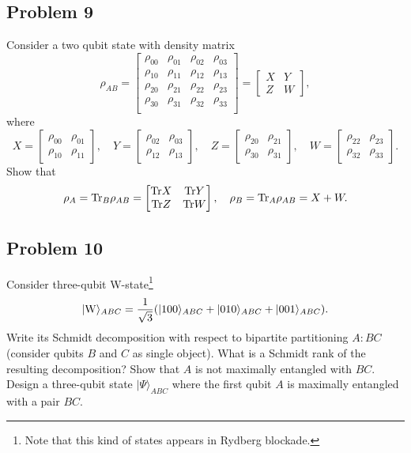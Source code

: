 \documentclass[a4paper,10pt]{article}
\newcommand{\ket}[1]{|#1\rangle}
\newcommand{\tr}{\ensuremath{{\rm Tr}}}
\begin{document}
\subsection*{Problem 9}
Consider a two qubit state with density matrix
\begin{equation}
	\rho_{AB} = \begin{bmatrix}
		\rho_{00} & \rho_{01} & \rho_{02} & \rho_{03} \\
		\rho_{10} & \rho_{11} & \rho_{12} & \rho_{13} \\
		\rho_{20} & \rho_{21} & \rho_{22} & \rho_{23} \\
		\rho_{30} & \rho_{31} & \rho_{32} & \rho_{33} \\
	\end{bmatrix} =
	\begin{bmatrix}
		X & Y \\
		Z & W
	\end{bmatrix},
\end{equation}
where
\begin{equation}
	X = 	\begin{bmatrix}
		\rho_{00} & \rho_{01} \\
		\rho_{10} & \rho_{11}
	\end{bmatrix}, \quad
	Y = 	\begin{bmatrix}
		\rho_{02} & \rho_{03} \\
		\rho_{12} & \rho_{13}
	\end{bmatrix}, \quad
	Z = 	\begin{bmatrix}
		\rho_{20} & \rho_{21} \\
		\rho_{30} & \rho_{31}
	\end{bmatrix}, \quad
	W = 	\begin{bmatrix}
		\rho_{22} & \rho_{23} \\
		\rho_{32} & \rho_{33}
	\end{bmatrix}.
\end{equation}
Show that
\begin{equation}
	\rho_{A} = \tr_{B}\rho_{AB} = 
	\begin{bmatrix}
		\tr X & \tr Y \\
		\tr Z & \tr W
	\end{bmatrix}, \quad
	\rho_{B} = \tr_{A}\rho_{AB}  = X+W.
\end{equation}


\subsection*{Problem 10}
Consider three-qubit W-state\footnote{Note that this kind of states appears in Rydberg blockade.}
\begin{equation}
	\ket{{\rm W}}_{ABC} = \frac{1}{\sqrt{3}}(\ket{100}_{ABC} + \ket{010}_{ABC} + \ket{001}_{ABC}).
\end{equation}
Write its Schmidt decomposition with respect to bipartite partitioning $A:BC$ (consider qubits $B$ and $C$ as single object).
What is a Schmidt rank of the resulting decomposition? 
Show that $A$ is not maximally entangled with $BC$.
Design a three-qubit state $\ket{\Psi}_{ABC}$ where the first qubit $A$ is maximally entangled with a pair $BC$.
\end{document}
